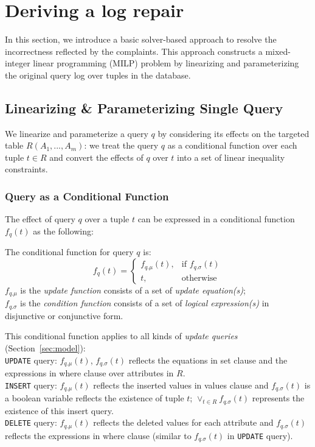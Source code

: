 \section{Deriving a log repair}
\label{sec:sol}
In this section, we 
introduce a basic solver-based approach to 
resolve the incorrectness reflected by the complaints. 
This approach 
constructs a mixed-integer linear 
programming (MILP) problem by
linearizing and parameterizing the 
original query log over tuples
in the database. 
\subsection{Linearizing \& Parameterizing Single Query}
\label{sec:linearize}
We linearize and parameterize a query $q$ by considering its effects on the 
targeted table $R(A_1, ..., A_m)$: we treat the query $q$ as a 
conditional function over each tuple $t\in R$ and convert the effects of $q$ 
over $t$ into a set of linear inequality constraints. 
\subsubsection{Query as a Conditional Function}
The effect of query $q$ over a tuple $t$ can be expressed in a conditional
function $f_q(t)$ as the following:
\begin{definition} 
\label{def:cond}
	The conditional function for query $q$ is:
	\[
    f_q(t)= 
\begin{cases}
    f_{q.\mu} (t) ,& \text{if } f_{q.\sigma} (t)\\
    t,              & \text{otherwise}
\end{cases}
\]
$f_{q.\mu}$ is the \textit{update function} consists of
 a set of \textit{update equation(s)};\\
 $f_{q.\sigma}$ is the 
 \textit{condition function} consists of a 
set of \textit{logical expression(s)} in 
disjunctive or conjunctive form.
\end{definition} 

 This conditional function applies 
to all kinds of \emph{update queries} (Section~\ref{sec:model}): \\
\texttt{UPDATE} query: $f_{q.\mu}(t)$, $f_{q.\sigma}(t)$ reflects the 
equations in
set clause and the expressions in where clause over attributes in
$R$. \\
\texttt{INSERT} query: $f_{q.\mu}(t)$ reflects the inserted values in
values clause and 
$f_{q.\sigma}(t)$ is a boolean variable 
reflects the existence of tuple $t$; 
$\vee_{t\in R} f_{q.\sigma}(t)$ 
represents
the existence of this insert query.  \\
\texttt{DELETE} query: $f_{q.\mu}(t)$ reflects the deleted values for 
each attribute and 
$f_{q.\sigma}(t)$ reflects the expressions in where clause (similar to
$f_{q.\sigma}(t)$ in \texttt{UPDATE} query).

